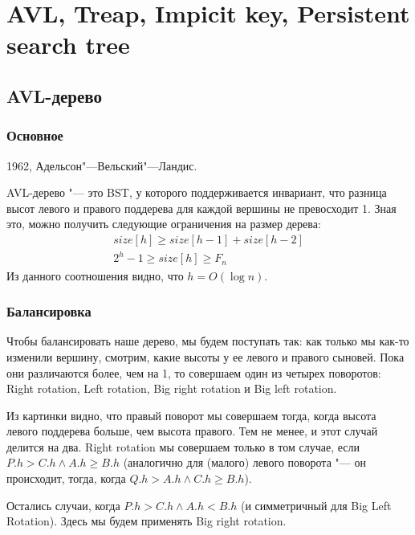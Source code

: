 \chapter{AVL, Treap, Impicit key, Persistent search tree}

\section{AVL-дерево}

\subsection{Основное}

1962, Адельсон"---Вельский"---Ландис.

AVL-дерево "--- это BST, у которого поддерживается инвариант, что разница высот левого и правого поддерева
для каждой вершины не превосходит 1.
Зная это, можно получить следующие ограничения на размер дерева:
\begin{gather*}
	size[h] \ge size[h - 1] + size[h - 2] \\
	2^h - 1 \ge size[h] \ge F_n
\end{gather*}
Из данного соотношения видно, что $h = O(\log n)$.

\subsection{Балансировка}

Чтобы балансировать наше дерево, мы будем поступать так: как только мы как-то изменили вершину, смотрим,
какие высоты у ее левого и правого сыновей.
Пока они различаются более, чем на 1, то совершаем один из четырех поворотов:
Right rotation, Left rotation, Big right rotation и Big left rotation.


Из картинки видно, что правый поворот мы совершаем тогда, когда высота левого поддерева больше, чем высота правого.
Тем не менее, и этот случай делится на два.
Right rotation мы совершаем только в том случае, если $P.h > C.h \land A.h \ge B.h$
(аналогично для (малого) левого поворота "--- он происходит, тогда, когда $Q.h > A.h \land C.h \ge B.h$).

Остались случаи, когда $P.h > C.h \land A.h < B.h$ (и симметричный для Big Left Rotation).
Здесь мы будем применять Big right rotation.



